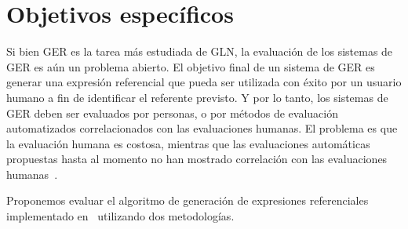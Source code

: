 \section{Objetivos espec\'ificos}
\label{objetivos}

Si bien GER es la tarea m\'as estudiada de GLN, la evaluaci\'on de los sistemas de GER es a\'un un problema abierto. El objetivo final de un sistema de GER es generar una expresi\'on referencial que pueda ser utilizada con \'exito por un usuario humano a fin de identificar el referente previsto. Y por lo tanto, los sistemas de GER deben ser evaluados por personas, o por m\'etodos de evaluaci\'on automatizados correlacionados con las evaluaciones humanas. El problema es que la evaluaci\'on humana es costosa, mientras que las evaluaciones autom\'aticas propuestas hasta al momento no han mostrado correlaci\'on con las evaluaciones humanas~\cite{Reiter09}.

Proponemos evaluar el algoritmo de generaci\'on de expresiones referenciales implementado en~\cite{Areces2008} utilizando dos metodolog\'ias. 

